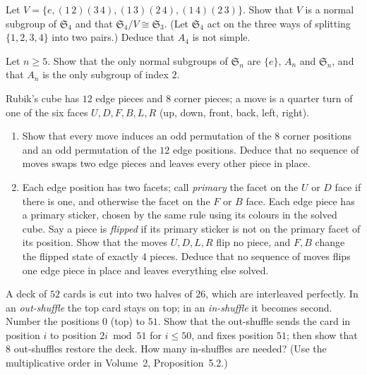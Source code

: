 \begin{exercise}[$\star\star$]\label{ex:v4}
Let $V=\{e,(1\,2)(3\,4),(1\,3)(2\,4),(1\,4)(2\,3)\}$. Show that $V$ is a normal subgroup of $\mathfrak S_4$ and that $\mathfrak S_4/V\cong\mathfrak S_3$. (Let $\mathfrak S_4$ act on the three ways of splitting $\{1,2,3,4\}$ into two pairs.) Deduce that $A_4$ is not simple.
\end{exercise}

\begin{exercise}[$\star\star$]\label{ex:normalSn}
Let $n\ge5$. Show that the only normal subgroups of $\mathfrak S_n$ are $\{e\}$, $A_n$ and $\mathfrak S_n$, and that $A_n$ is the only subgroup of index $2$.
\end{exercise}

\begin{exercise}[$\star\star$]\label{ex:rubik}
Rubik's cube has $12$ edge pieces and $8$ corner pieces; a move is a quarter turn of one of the six faces $U,D,F,B,L,R$ (up, down, front, back, left, right).
\begin{enumerate}[label=(\alph*)]
\item Show that every move induces an odd permutation of the $8$ corner positions and an odd permutation of the $12$ edge positions. Deduce that no sequence of moves swaps two edge pieces and leaves every other piece in place.
\item Each edge position has two facets; call \emph{primary} the facet on the $U$ or $D$ face if there is one, and otherwise the facet on the $F$ or $B$ face. Each edge piece has a primary sticker, chosen by the same rule using its colours in the solved cube. Say a piece is \emph{flipped} if its primary sticker is not on the primary facet of its position. Show that the moves $U,D,L,R$ flip no piece, and $F,B$ change the flipped state of exactly $4$ pieces. Deduce that no sequence of moves flips one edge piece in place and leaves everything else solved.
\end{enumerate}
\end{exercise}

\begin{exercise}[$\star\star$]\label{ex:shuffle}
A deck of $52$ cards is cut into two halves of $26$, which are interleaved perfectly. In an \emph{out-shuffle} the top card stays on top; in an \emph{in-shuffle} it becomes second. Number the positions $0$ (top) to $51$. Show that the out-shuffle sends the card in position $i$ to position $2i\bmod 51$ for $i\le50$, and fixes position $51$; then show that $8$ out-shuffles restore the deck. How many in-shuffles are needed? (Use the multiplicative order in Volume~2, Proposition~5.2.)
\end{exercise}

